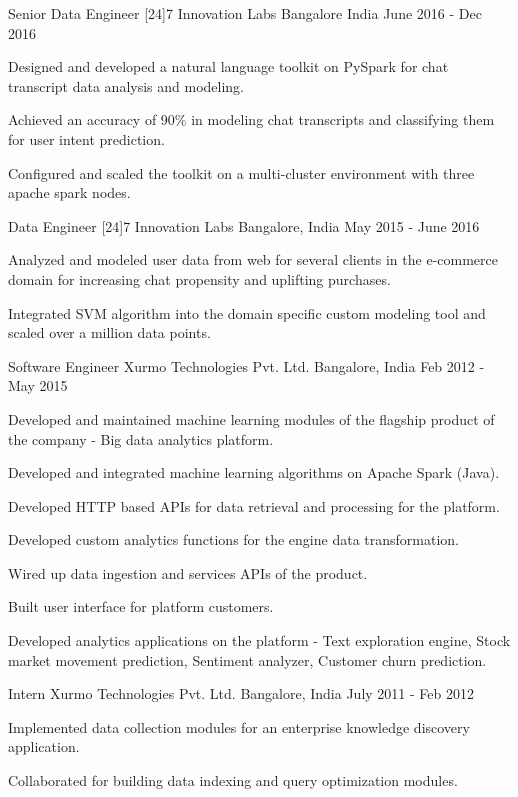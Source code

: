 \begin{cventries}
  \cventry
    {Senior Data Engineer}
    {[24]7 Innovation Labs}
    {Bangalore India}
    {June 2016 - Dec 2016}
    {
      \begin{cvitems}
        \item {Designed and developed a natural language toolkit on PySpark for chat transcript data analysis and modeling.}
        \item {Achieved an accuracy of 90\% in modeling chat transcripts and classifying them for user intent prediction.}
        \item {Configured and scaled the toolkit on a multi-cluster environment with three apache spark nodes.}
      \end{cvitems}
    }
  \cventry
    {Data Engineer}
    {[24]7 Innovation Labs}
    {Bangalore, India}
    {May 2015 - June 2016}
    {
      \begin{cvitems}
        \item {Analyzed and modeled user data from web for several clients in the e-commerce domain for increasing chat propensity and uplifting purchases.}
        \item {Integrated SVM algorithm into the domain specific custom modeling tool and scaled over a million data points.}
      \end{cvitems}
    }
  \cventry
    {Software Engineer}
    {Xurmo Technologies Pvt. Ltd.}
    {Bangalore, India}
    {Feb 2012 - May 2015}
    {
      \begin{cvitems}
        \item {Developed and maintained machine learning modules of the flagship product of the company - Big data analytics platform.}
        \item {Developed and integrated machine learning algorithms on Apache Spark (Java).}
        \item {Developed HTTP based APIs for data retrieval and processing for the platform.}
        \item {Developed custom analytics functions for the engine data transformation.}
        \item {Wired up data ingestion and services APIs of the product.}
        \item {Built user interface for platform customers.}
        \item {Developed analytics applications on the platform - Text exploration engine, Stock market movement prediction, Sentiment analyzer, Customer churn prediction.}
      \end{cvitems} 
    }
  \cventry
    {Intern}
    {Xurmo Technologies Pvt. Ltd.}
    {Bangalore, India}
    {July 2011 - Feb 2012}
    {
      \begin{cvitems}
        \item {Implemented data collection modules for an enterprise knowledge discovery application.}
        \item {Collaborated for building data indexing and query optimization modules.}
      \end{cvitems} 
    }
\end{cventries}
